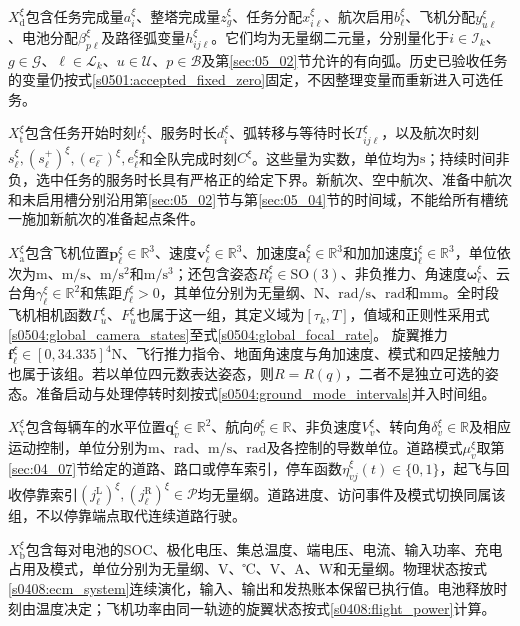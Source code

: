 $X_{\mathrm d}^\xi$包含任务完成量$a_i^\xi$、整塔完成量$z_g^\xi$、任务分配$x_{i\ell}^\xi$、航次启用$b_\ell^\xi$、飞机分配$y_{u\ell}^\xi$、电池分配$\beta_{p\ell}^\xi$及路径弧变量$h_{ij\ell}^\xi$。它们均为无量纲二元量，分别量化于$i\in\mathcal I_k$、$g\in\mathcal G$、$\ell\in\mathcal L_k$、$u\in\mathcal U$、$p\in\mathcal B$及第\ref{sec:05_02}节允许的有向弧。历史已验收任务的变量仍按式\eqref{s0501:accepted_fixed_zero}固定，不因整理变量而重新进入可选任务。

$X_{\mathrm t}^\xi$包含任务开始时刻$t_i^\xi$、服务时长$d_i^\xi$、弧转移与等待时长$T_{ij\ell}^\xi$，以及航次时刻$s_\ell^\xi,(s_\ell^+)^\xi,(e_\ell^-)^\xi,e_\ell^\xi$和全队完成时刻$C^\xi$。这些量为实数，单位均为$\mathrm s$；持续时间非负，选中任务的服务时长具有严格正的给定下界。新航次、空中航次、准备中航次和未启用槽分别沿用第\ref{sec:05_02}节与第\ref{sec:05_04}节的时间域，不能给所有槽统一施加新航次的准备起点条件。

$X_{\mathrm a}^\xi$包含飞机位置$\mathbf p_\ell^\xi\in\mathbb R^3$、速度$\mathbf v_\ell^\xi\in\mathbb R^3$、加速度$\mathbf a_\ell^\xi\in\mathbb R^3$和加加速度$\mathbf j_\ell^\xi\in\mathbb R^3$，单位依次为$\mathrm m$、$\mathrm{m/s}$、$\mathrm{m/s^2}$和$\mathrm{m/s^3}$；还包含姿态$R_\ell^\xi\in\mathrm{SO}(3)$、非负推力、角速度$\boldsymbol\omega_\ell^\xi$、云台角$\gamma_\ell^\xi\in\mathbb R^2$和焦距$f_\ell^\xi>0$，其单位分别为无量纲、$\mathrm N$、$\mathrm{rad/s}$、$\mathrm{rad}$和$\mathrm{mm}$。全时段飞机相机函数$\Gamma_u^\xi$、$F_u^\xi$也属于这一组，其定义域为$[\tau_k,T]$，值域和正则性采用式\eqref{s0504:global_camera_states}至式\eqref{s0504:global_focal_rate}。 旋翼推力$\mathbf f_\ell^\xi\in[0,34.335]^4$N、飞行推力指令、地面角速度与角加速度、模式和四足接触力也属于该组。若以单位四元数表达姿态，则$R=R(q)$，二者不是独立可选的姿态。准备启动与处理停转时刻按式\eqref{s0504:ground_mode_intervals}并入时间组。

$X_{\mathrm v}^\xi$包含每辆车的水平位置$\mathbf q_v^\xi\in\mathbb R^2$、航向$\theta_v^\xi\in\mathbb R$、非负速度$V_v^\xi$、转向角$\delta_v^\xi\in\mathbb R$及相应运动控制，单位分别为$\mathrm m$、$\mathrm{rad}$、$\mathrm{m/s}$、$\mathrm{rad}$及各控制的导数单位。道路模式$\mu_v^\xi$取第\ref{sec:04_07}节给定的道路、路口或停车索引，停车函数$\eta_{vj}^\xi(t)\in\{0,1\}$，起飞与回收停靠索引$(j_\ell^{\mathrm L})^\xi,(j_\ell^{\mathrm R})^\xi\in\mathcal P$均无量纲。道路进度、访问事件及模式切换同属该组，不以停靠端点取代连续道路行驶。

$X_{\mathrm b}^\xi$包含每对电池的SOC、极化电压、集总温度、端电压、电流、输入功率、充电占用及模式，单位分别为无量纲、V、℃、V、A、W和无量纲。物理状态按式\eqref{s0408:ecm_system}连续演化，输入、输出和发热账本保留已执行值。电池释放时刻由温度决定；飞机功率由同一轨迹的旋翼状态按式\eqref{s0408:flight_power}计算。

